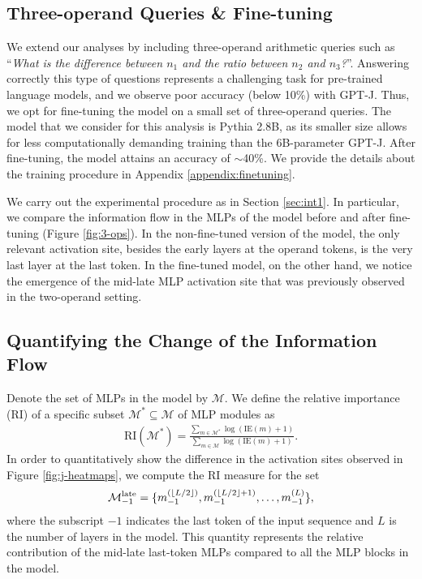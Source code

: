 \documentclass[11pt]{article}
\newcommand{\atl}[2]{#1^{(#2)}}
\DeclarePairedDelimiter\floor{\lfloor}{\rfloor}
\begin{document}
\subsection{Three-operand Queries \& Fine-tuning}
\label{sec:3-ops}
We extend our analyses by including three-operand arithmetic queries such as ``\textit{What is the difference between $n_1$ and the ratio between $n_2$ and $n_3$?}''. Answering correctly this type of questions represents a challenging task for pre-trained language models, and we observe poor accuracy (below 10\%) with GPT-J. Thus, we opt for fine-tuning the model on a small set of three-operand queries. 
The model that we consider for this analysis is Pythia 2.8B, as its smaller size allows for less computationally demanding training than the 6B-parameter GPT-J. After fine-tuning, the model attains an accuracy of $\sim$40\%. We provide the details about the training procedure in Appendix \ref{appendix:finetuning}.

We carry out the experimental procedure as in Section \ref{sec:int1}. In particular, we compare the information flow in the MLPs of the model before and after fine-tuning (Figure \ref{fig:3-ops}). In the non-fine-tuned version of the model, the only relevant activation site, besides the early layers at the operand tokens, is the very last layer at the last token.
In the fine-tuned model, on the other hand, we notice the emergence of the mid-late MLP activation site that was previously observed in the two-operand setting. 


\subsection{Quantifying the Change of the Information Flow}
\label{sec:quantify}
Denote the set of MLPs in the model by $\mathcal{M}$. We define the relative importance (RI) of a specific subset $\mathcal{M}^* \subseteq \mathcal{M}$ of MLP modules as
\begin{align}
    \label{eq:effect_ratio}
    \mathrm{RI}(\mathcal{M}^*) = \frac{\sum_{m \in \mathcal{M}^*} \log(\mathrm{IE}(m) + 1)}{\sum_{m \in \mathcal{M}} \log(\mathrm{IE}(m) + 1)}.
\end{align}
In order to quantitatively show the difference in the activation sites observed in Figure \ref{fig:j-heatmaps}, we compute the RI measure for the set
\begin{align}
    \notag
    \mathcal{M}_{-1}^{\text{late}} = \{\atl{m}{\floor*{L/2}}_{-1},\atl{m}{\floor*{L/2}+1}_{-1}, \dots, \atl{m}{L}_{-1} \},
\end{align}
where the subscript $-1$ indicates the last token of the input sequence and $L$ is the number of layers in the model. 
This quantity represents the relative contribution of the mid-late last-token MLPs compared to all the MLP blocks in the model.
\end{document}
